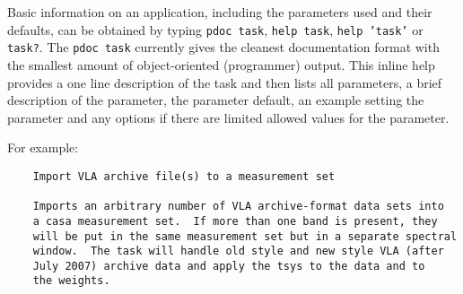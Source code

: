 Basic information on an application, including the parameters used and
their defaults, can be obtained by typing {\tt pdoc task}, 
{\tt help task}, {\tt help 'task'} or
{\tt task?}. The {\tt pdoc task} currently gives the cleanest
documentation format with the smallest amount of object-oriented 
(programmer) output.  This inline help provides a one line description of
the task and then lists all parameters, a brief description of the
parameter, the parameter default, an example setting the parameter and
any options if there are limited allowed values for the parameter.

For example:
\small
\begin{verbatim}
    Import VLA archive file(s) to a measurement set
    
    Imports an arbitrary number of VLA archive-format data sets into
    a casa measurement set.  If more than one band is present, they
    will be put in the same measurement set but in a separate spectral
    window.  The task will handle old style and new style VLA (after
    July 2007) archive data and apply the tsys to the data and to
    the weights.
    

\end{verbatim}

